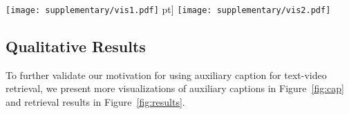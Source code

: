 \documentclass[10pt,twocolumn,letterpaper]{article}
\begin{document}
\begin{table}[t]
\centering
{}
    \vspace{-1mm}
    \caption{Ensemble baselines (ViT-B/32 w/ global matching).
    }
    \label{tab:ense}
\end{table}
\begin{table}[t]
\centering
{}
    \caption{Caption baseline with different Captioner setting.}
    \label{tab:caper}
\end{table}	











\begin{figure*}
\centering
  \texttt{[image: supplementary/vis1.pdf]} \7pt]
  \texttt{[image: supplementary/vis2.pdf]}
  \caption{Examples of text-video retrieval results on the MSRVTT 1K-A test set. The left are the videos ranked by our Cap4Video, and the right are the results from the model without involving caption.}
  \label{fig:results}
\end{figure*}




\subsection{Qualitative Results}\label{sec:vis}
To further validate our motivation for using auxiliary caption for text-video retrieval, we present more visualizations of auxiliary captions in Figure~\ref{fig:cap} and retrieval results in Figure~\ref{fig:results}.
 
\end{document}
